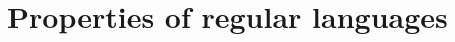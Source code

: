 

\setcounter{section}{3}
\setcounter{subsection}{1}
\setcounter{dfn}{0}

\section{Properties of regular languages}

